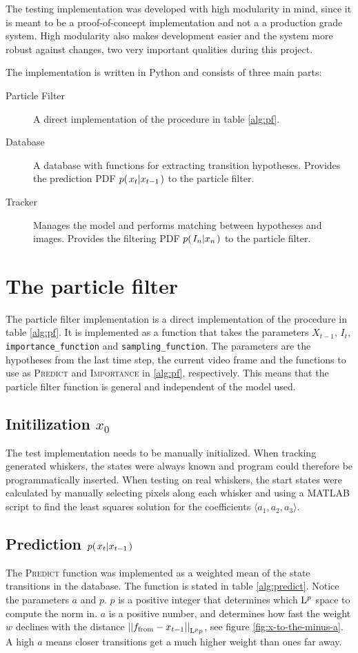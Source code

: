 The testing implementation was developed with high modularity in
mind, since it is meant to be a proof-of-concept implementation and
not a a production grade system. High modularity also makes
development easier and the system more robust against changes, two
very important qualities during this project.

The implementation is written in Python and consists of three main parts:
\begin{description}
  \item[Particle Filter] A direct  implementation of the procedure in
    table \ref{alg:pf}.
  \item[Database] A database with functions for extracting transition
    hypotheses. Provides the prediction PDF $\cprobnext{x}$ to the
    particle filter.
  \item[Tracker] Manages the model and performs matching between
    hypotheses and images. Provides the filtering PDF
    $\cprob{I_n}{x_n}$ to the particle filter.
\end{description}

\section{The particle filter}

The particle filter implementation is a direct implementation of the
procedure in table \ref{alg:pf}. It is implemented as a function that
takes the parameters $X_{t-1}$, $I_t$, \texttt{importance\_function} and
\texttt{sampling\_function}. The parameters are the hypotheses from
the last time step, the current video frame and the functions to use
as \textsc{Predict} and \textsc{Importance} in \ref{alg:pf},
respectively. This means that the particle filter function is general
and independent of the model used.

\subsection{Initilization $x_0$}
The test implementation needs to be manually initialized. When
tracking generated whiskers, the states were always known and program
could therefore be programmatically inserted. When testing on real
whiskers, the start states were calculated by manually
selecting pixels along each whisker and using a MATLAB script to find
the least squares solution for the coefficients $\langle a_1, a_2, a_3 \rangle$.

\subsection{Prediction $\cprobnext{x}$}
The \textsc{Predict} function was implemented as a weighted mean of the
state transitions in the database. The function is stated in table
\ref{alg:predict}. Notice the parameters $a$ and $p$. $p$ is a
positive integer that determines which $\Lp$ space to compute the norm
in. $a$ is a positive number, and determines how fast the weight $w$
declines with the distance $\Lpnorm[p]{\tf - x_{t-1}}$, see figure
\ref{fig:x-to-the-minus-a}. A high $a$ means closer transitions get a
much higher weight than ones far away.

